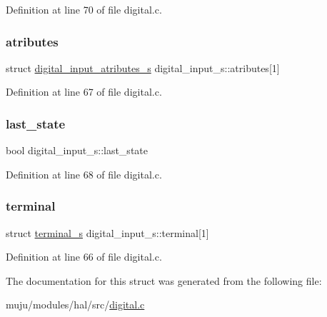 Definition at line 70 of file digital.\+c.

\mbox{\label{structdigital__input__s_a632405523a299371496e67e0ac52f865}} 
\subsubsection{\texorpdfstring{atributes}{atributes}}
{\footnotesize\ttfamily struct \hyperlink{structdigital__input__atributes__s}{digital\+\_\+input\+\_\+atributes\+\_\+s} digital\+\_\+input\+\_\+s\+::atributes\mbox{[}1\mbox{]}}



Definition at line 67 of file digital.\+c.

\mbox{\label{structdigital__input__s_ad2789153648da72a5988b89dfa5d5b1e}} 
\subsubsection{\texorpdfstring{last\+\_\+state}{last\_state}}
{\footnotesize\ttfamily bool digital\+\_\+input\+\_\+s\+::last\+\_\+state}



Definition at line 68 of file digital.\+c.

\mbox{\label{structdigital__input__s_a49e69af62c9177bbb3a94716de622112}} 
\subsubsection{\texorpdfstring{terminal}{terminal}}
{\footnotesize\ttfamily struct \hyperlink{structterminal__s}{terminal\+\_\+s} digital\+\_\+input\+\_\+s\+::terminal\mbox{[}1\mbox{]}}



Definition at line 66 of file digital.\+c.



The documentation for this struct was generated from the following file\+:\begin{DoxyCompactItemize}
\item 
muju/modules/hal/src/\hyperlink{muju_2modules_2hal_2src_2digital_8c}{digital.\+c}\end{DoxyCompactItemize}
